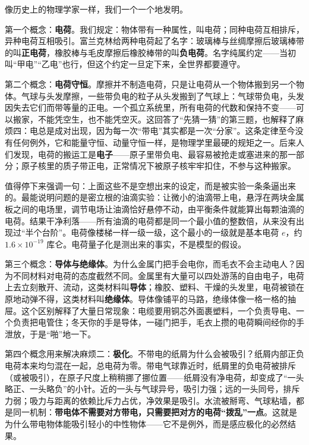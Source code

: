 
\begin{mainline}
像历史上的物理学家一样，我们一个一个地发明。

第一个概念：\textbf{电荷}。我们规定：物体带有一种属性，叫电荷；同种电荷互相排斥，异种电荷互相吸引。富兰克林给两种电荷起了名字：玻璃棒与丝绸摩擦后玻璃棒带的叫\textbf{正电荷}，橡胶棒与毛皮摩擦后橡胶棒带的叫\textbf{负电荷}。名字纯属约定——当初叫“甲电”“乙电”也行，但这个约定一旦定下来，全世界都要遵守。

第二个概念：\textbf{电荷守恒}。摩擦并不制造电荷，只是让电荷从一个物体搬到另一个物体。气球与头发摩擦，一些带负电的粒子从头发搬到了气球上：气球带负电，头发因失去它们而带等量的正电。一个孤立系统里，所有电荷的代数和保持不变——可以搬家，不能凭空生，也不能凭空灭。这回答了“先猜一猜”的第三题，也解释了麻烦四：电总是成对出现，因为每一次“带电”其实都是一次“分家”。这条定律至今没有任何例外，它和能量守恒、动量守恒一样，是物理学里最硬的规矩之一。后来人们发现，电荷的搬运工是\textbf{电子}——原子里带负电、最容易被抢走或塞进来的那一部分；原子核里的质子带正电，正常情况下被原子核牢牢扣住，不参与这种搬家。

值得停下来强调一句：上面这些不是空想出来的设定，而是被实验一条条逼出来的。最能说明问题的是密立根的油滴实验：让微小的油滴带上电，悬浮在两块金属板之间的电场里，调节电场让油滴恰好悬停不动，由平衡条件就能算出每颗油滴的电荷。结果干净利落——所有油滴的电荷都是同一个最小值的整数倍，从来没有出现过“半个台阶”。电荷像楼梯一样一级一级，这个最小的一级就是基本电荷 \(e\)，约 \(1.6\times10^{-19}\) 库仑。电荷量子化是测出来的事实，不是模型的假设。

第三个概念：\textbf{导体与绝缘体}。为什么金属门把手会电你，而毛衣不会主动电人？因为不同材料对电荷的态度截然不同。金属里有大量可以四处游荡的自由电子，电荷上去立刻散开、流动，这类材料叫\textbf{导体}；橡胶、塑料、干燥的头发里，电荷被锁在原地动弹不得，这类材料叫\textbf{绝缘体}。导体像铺平的马路，绝缘体像一格一格的抽屉。这个区别解释了大量日常现象：电缆要用铜芯外面裹塑料，一个负责导电、一个负责把电管住；冬天你的手是导体，一碰门把手，毛衣上攒的电荷瞬间经你的手泄放，于是“啪”地一下。

第四个概念用来解决麻烦二：\textbf{极化}。不带电的纸屑为什么会被吸引？纸屑内部正负电荷本来均匀混在一起，总电荷为零。带电气球靠近时，纸屑里的负电荷被排斥（或被吸引），在原子尺度上稍稍挪了挪位置——纸屑没有净电荷，却变成了“一头略正、一头略负”的小针。近的一头与气球异号，吸引力强；远的一头同号，排斥力弱；吸力与距离的依赖比斥力占优，净效果是吸引。水流被掰弯、气球粘墙，都是同一机制：\textbf{带电体不需要对方带电，只需要把对方的电荷“拨乱”一点}。这就是为什么带电物体能吸引轻小的中性物体——它不是例外，而是感应极化的必然结果。


\end{mainline}
